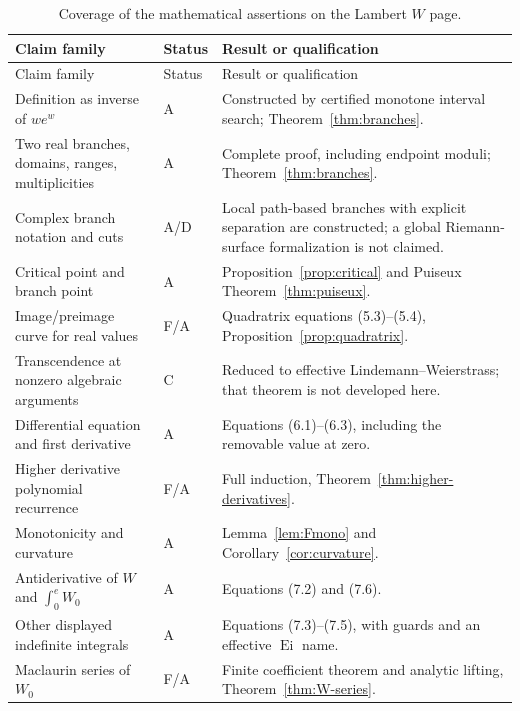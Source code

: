 \documentclass[11pt]{article}
\theoremstyle{definition}
\newcommand{\Ei}{\operatorname{Ei}}
\newcommand{\StatusF}{\textsf{F}}
\newcommand{\StatusA}{\textsf{A}}
\newcommand{\StatusC}{\textsf{C}}
\newcommand{\StatusD}{\textsf{D}}
\begin{document}
\begin{longtable}{>{\raggedright\arraybackslash}p{}
                  >{\centering\arraybackslash}p{}
                  >{\raggedright\arraybackslash}p{}}
\caption{Coverage of the mathematical assertions on the Lambert \(W\) page.}
\label{tab:audit}\\
\toprule
Claim family & Status & Result or qualification\\
\midrule
\endfirsthead
\toprule
Claim family & Status & Result or qualification\\
\midrule
\endhead
Definition as inverse of \(we^w\) & \StatusA & Constructed by certified
monotone interval search; Theorem~\ref{thm:branches}.\\
Two real branches, domains, ranges, multiplicities & \StatusA & Complete proof,
including endpoint moduli; Theorem~\ref{thm:branches}.\\
Complex branch notation and cuts & \StatusA/\StatusD & Local path-based branches
with explicit separation are constructed; a global Riemann-surface
formalization is not claimed.\\
Critical point and branch point & \StatusA & Proposition~\ref{prop:critical}
and Puiseux Theorem~\ref{thm:puiseux}.\\
Image/preimage curve for real values & \StatusF/\StatusA & Quadratrix equations
(5.3)--(5.4), Proposition~\ref{prop:quadratrix}.\\
Transcendence at nonzero algebraic arguments & \StatusC & Reduced to effective
Lindemann--Weierstrass; that theorem is not developed here.\\
Differential equation and first derivative & \StatusA & Equations
(6.1)--(6.3), including the removable value at zero.\\
Higher derivative polynomial recurrence & \StatusF/\StatusA & Full induction,
Theorem~\ref{thm:higher-derivatives}.\\
Monotonicity and curvature & \StatusA & Lemma~\ref{lem:Fmono} and
Corollary~\ref{cor:curvature}.\\
Antiderivative of \(W\) and \(\int_0^eW_0\) & \StatusA & Equations
(7.2) and (7.6).\\
Other displayed indefinite integrals & \StatusA & Equations (7.3)--(7.5), with
guards and an effective \(\Ei\) name.\\
Maclaurin series of \(W_0\) & \StatusF/\StatusA & Finite coefficient theorem
and analytic lifting, Theorem~\ref{thm:W-series}.\\

\end{longtable}
\end{document}
